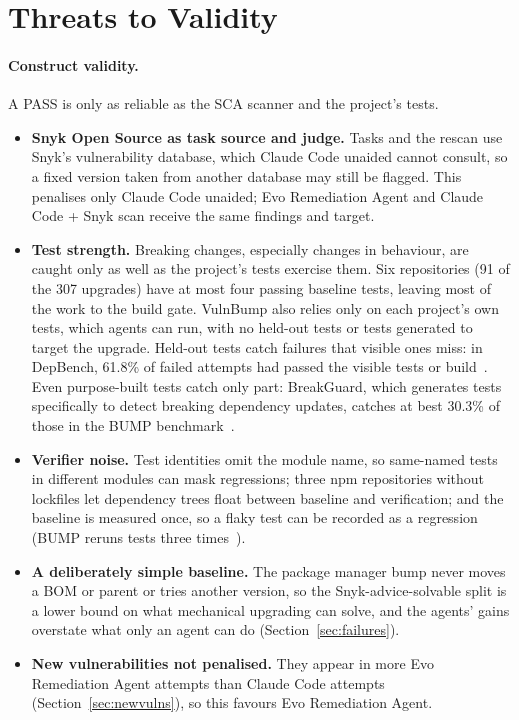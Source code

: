 \documentclass[11pt]{article}
\theoremstyle{definition}
\newcommand{\bench}{VulnBump}
\newcommand{\evo}{Evo Remediation Agent}
\newcommand{\aided}{Claude Code + Snyk scan}
\newcommand{\unaided}{Claude Code unaided}
\newcommand{\pmbump}{package manager bump}
\begin{document}
\section{Threats to Validity}
\label{sec:limitations}

\paragraph{Construct validity.} A PASS is only as reliable as the SCA scanner and the project's tests.
\begin{itemize}
  \item \textbf{Snyk Open Source as task source and judge.} Tasks and the rescan use Snyk's vulnerability database, which \unaided{} cannot consult, so a fixed version taken from another database may still be flagged. This penalises only \unaided{}; \evo{} and \aided{} receive the same findings and target.
  \item \textbf{Test strength.} Breaking changes, especially changes in behaviour, are caught only as well as the project's tests exercise them. Six repositories (91 of the 307 upgrades) have at most four passing baseline tests, leaving most of the work to the build gate. \bench{} also relies only on each project's own tests, which agents can run, with no held-out tests or tests generated to target the upgrade. Held-out tests catch failures that visible ones miss: in DepBench, 61.8\% of failed attempts had passed the visible tests or build~\cite{luo2026depbench}. Even purpose-built tests catch only part: BreakGuard, which generates tests specifically to detect breaking dependency updates, catches at best 30.3\% of those in the BUMP benchmark~\cite{raj2026breakguard}.
  \item \textbf{Verifier noise.} Test identities omit the module name, so same-named tests in different modules can mask regressions; three npm repositories without lockfiles let dependency trees float between baseline and verification; and the baseline is measured once, so a flaky test can be recorded as a regression (BUMP reruns tests three times~\cite{reyes2024bump}).
  \item \textbf{A deliberately simple baseline.} The \pmbump{} never moves a BOM or parent or tries another version, so the Snyk-advice-solvable split is a lower bound on what mechanical upgrading can solve, and the agents' gains overstate what only an agent can do (Section~\ref{sec:failures}).
  \item \textbf{New vulnerabilities not penalised.} They appear in more \evo{} attempts than Claude Code attempts (Section~\ref{sec:newvulns}), so this favours \evo{}.
\end{itemize}
\end{document}
